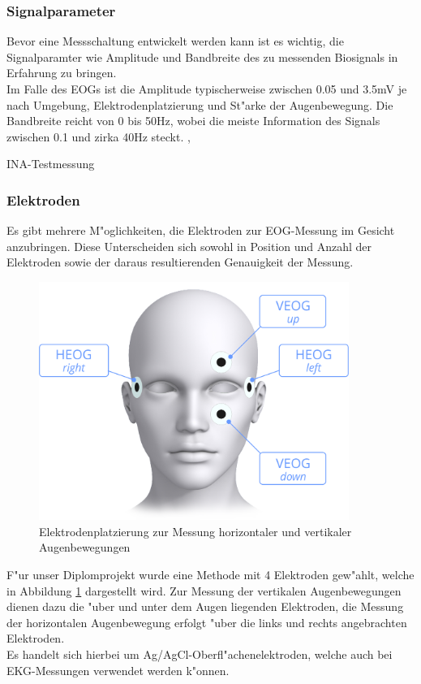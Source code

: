 \subsubsection {Signalparameter} \label {signalparamater}

Bevor eine Messschaltung entwickelt werden kann ist es wichtig, die Signalparamter wie Amplitude und Bandbreite des zu messenden Biosignals in Erfahrung zu bringen.\\
Im Falle des EOGs ist die Amplitude typischerweise zwischen 0.05 und 3.5mV je nach Umgebung, Elektrodenplatzierung und St"arke der Augenbewegung. Die Bandbreite reicht von 0 bis 50Hz, wobei die meiste Information des Signals zwischen 0.1 und zirka 40Hz steckt. \cite{reg205},\cite{reg203}

INA-Testmessung
\subsubsection {Elektroden} \label {elektroden} 
Es gibt mehrere M"oglichkeiten, die Elektroden zur EOG-Messung im Gesicht anzubringen. Diese Unterscheiden sich sowohl in Position und Anzahl der Elektroden sowie der daraus resultierenden Genauigkeit der Messung.
\begin{figure}[h]
	\centering
		\includegraphics[width=0.9\textwidth]{Fuchs/Elektrodenplatzierung.png}
	\caption{Elektrodenplatzierung zur Messung horizontaler und vertikaler Augenbewegungen}
	\label{fig:Elektrodenplatzierung}
\end{figure}
F"ur unser Diplomprojekt wurde eine Methode mit 4 Elektroden gew"ahlt, welche in Abbildung \ref{fig:Elektrodenplatzierung} dargestellt wird. Zur Messung der vertikalen Augenbewegungen dienen dazu die "uber und unter dem Augen liegenden Elektroden, die Messung der horizontalen Augenbewegung erfolgt "uber die links und rechts angebrachten Elektroden. \\
Es handelt sich hierbei um Ag/AgCl-Oberfl"achenelektroden, welche auch bei EKG-Messungen verwendet werden k"onnen. 
